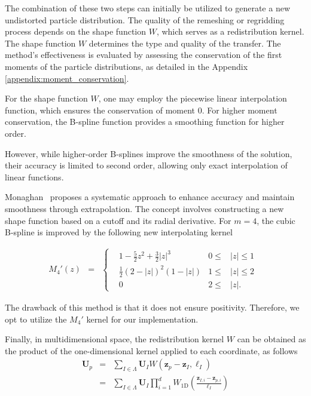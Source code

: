 The combination of these two steps can initially be utilized to generate a new undistorted particle distribution. The quality of the remeshing or regridding process depends on the shape function $W$, which serves as a redistribution kernel.
The shape function $W$ determines the type and quality of the transfer. The method's effectiveness is evaluated by assessing the conservation of the first moments of the particle distributions, as detailed in the Appendix \ref{appendix:moment_conservation}.

For the shape function $W$, one may employ the piecewise linear interpolation function, which ensures the conservation of moment 0. For higher moment conservation, the B-spline function provides a smoothing function for higher order.

However, while higher-order B-splines improve the smoothness of the solution, their accuracy is limited to second order, allowing only exact interpolation of linear functions.

Monaghan~\cite{monaghan_extrapolating_1985} proposes a systematic approach to enhance accuracy and maintain smoothness through extrapolation. The concept involves constructing a new shape function based on a cutoff and its radial derivative. For $m = 4$, the cubic B-spline is improved by the following new interpolating kernel

\begin{eqnarray*}~\label{cubic_radial_kernel}
	M_4'(z) &=& \left\{ \begin{aligned}
		 & 1 - \frac{5}{2}z^2 + \frac{3}{2} |z|^3 & 0 \leq & |z| \leq  1 & \\
		 & \frac{1}{2}{(2 - |z|)}^2(1 - |z|)      & 1 \leq & |z| \leq 2  & \\
		 & 0                                      & 2 \leq & |z|.
	\end{aligned}
	\right.
\end{eqnarray*}

The drawback of this method is that it does not ensure positivity. Therefore, we opt to utilize the $M_4'$ kernel for our implementation.

Finally, in multidimensional space, the redistribution kernel $W$ can be obtained as the product of the one-dimensional kernel applied to each coordinate, as follows
\begin{eqnarray*}
	\bm U_p &=& \sum_{I \in \Lambda} \bm U_I  W \left(\bm z_p - \bm z_I, \ell_I \right) \\
	&=&  \sum_{I \in \Lambda} \bm U_I  \prod_{i = 1}^d W_{1\text{D}} \left(\frac{\bm z_{I, i} - \bm z_{p, i}}{\ell_I} \right)
\end{eqnarray*}